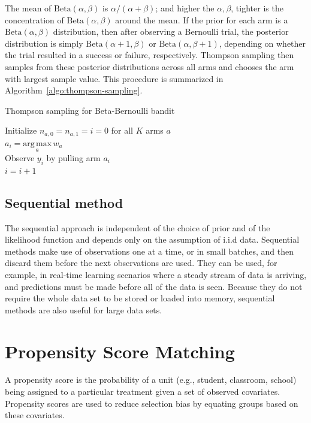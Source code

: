 \documentclass{article}
\begin{document}
The mean of $\mathrm{Beta}(\alpha,\beta)$ is $\alpha / (\alpha +
\beta)$; and higher the $\alpha, \beta$, tighter is the concentration
of $\mathrm{Beta}(\alpha,\beta)$ around the mean. If the prior
for each arm is a $\mathrm{Beta}(\alpha,\beta)$ distribution, then
after observing a Bernoulli trial, the posterior distribution is
simply $\mathrm{Beta}(\alpha + 1,\beta)$ or
$\mathrm{Beta}(\alpha,\beta +1)$, depending on whether the trial
resulted in a success or failure, respectively. Thompson sampling then
samples from these posterior distributions across all arms and chooses
the arm with largest sample value. This procedure is summarized in
Algorithm~\ref{algo:thompson-sampling}.

\begin{algorithm}[h] \label{algo:thompson-sampling}

  \caption{Thompson sampling for Beta-Bernoulli bandit}
  Initialize $n_{a,0}=n_{a,1}=i=0$ for all $K$ arms $a$ \\
   {
    $a_i = \underset{a}{\mathrm{arg\, max}}\, w_a$ \\
    Observe $y_i$ by pulling arm $a_i$ \\
    $i = i + 1$ \\
 }
\end{algorithm}

\subsection{Sequential method}
The sequential approach is independent of the choice of prior and of
the likelihood function and depends only on the assumption of i.i.d
data. Sequential methods make use of observations one at a time, or in
small batches, and then discard them before the next observations are
used. They can be used, for example, in real-time learning scenarios
where a steady stream of data is arriving, and predictions must be
made before all of the data is seen. Because they do not require the
whole data set to be stored or loaded into memory, sequential methods
are also useful for large data sets.

\section{Propensity Score Matching}
A propensity score is the probability of a unit (e.g., student,
classroom, school) being assigned to a particular treatment given a
set of observed covariates. Propensity scores are used to reduce
selection bias by equating groups based on these covariates.
\end{document}
